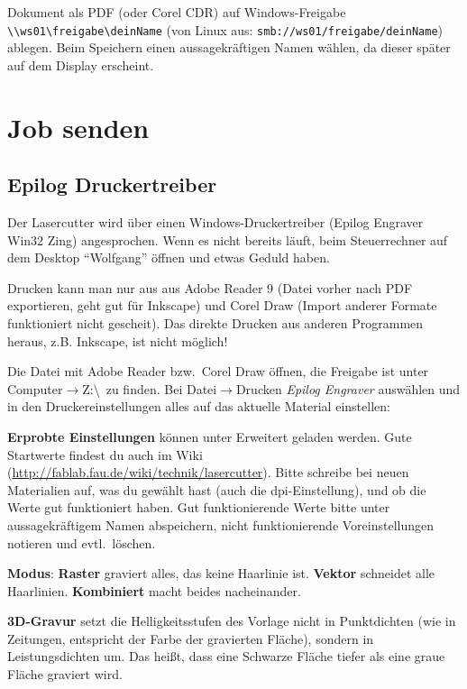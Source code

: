 \documentclass{\basedir/fablab-document}
\begin{document}
Dokument als PDF (oder Corel CDR) auf Windows-Freigabe \texttt{\textbackslash\textbackslash ws01\textbackslash freigabe\textbackslash deinName} (von Linux aus: \texttt{smb://ws01/freigabe/deinName}) ablegen. Beim Speichern einen aussagekräftigen Namen wählen, da dieser später auf dem Display erscheint.

\section{Job senden}
\subsection{Epilog Druckertreiber}

Der Lasercutter wird über einen Windows-Druckertreiber (Epilog Engraver Win32 Zing) angesprochen. Wenn es nicht bereits läuft, beim Steuerrechner auf dem Desktop \enquote{Wolfgang} %
 öffnen und etwas Geduld haben.

Drucken kann man nur aus aus Adobe Reader 9 (Datei vorher nach PDF exportieren, geht gut für Inkscape) und Corel Draw (Import anderer Formate funktioniert nicht gescheit).  Das direkte Drucken aus anderen Programmen heraus, z.B. Inkscape, ist nicht möglich!

Die Datei mit Adobe Reader bzw.\  Corel Draw öffnen, die Freigabe ist unter Computer$\rightarrow$Z:\textbackslash \ zu finden. Bei Datei$\rightarrow$Drucken \textit{Epilog Engraver} auswählen und in den Druckereinstellungen alles auf das aktuelle Material einstellen:

\textbf{Erprobte Einstellungen} können unter Erweitert geladen werden. Gute Startwerte findest du auch im Wiki (\url{http://fablab.fau.de/wiki/technik/lasercutter}). Bitte schreibe bei neuen Materialien auf, was du gewählt hast (auch die dpi-Einstellung), und ob die Werte gut funktioniert haben. Gut funktionierende Werte bitte unter aussagekräftigem Namen abspeichern, nicht funktionierende Voreinstellungen notieren und evtl.\  löschen.

\textbf{Modus}: \textbf{Raster} graviert alles, das keine Haarlinie ist. \textbf{Vektor} schneidet alle Haarlinien. \textbf{Kombiniert} macht beides nacheinander.

\textbf{3D-Gravur} setzt die Helligkeitsstufen des Vorlage nicht in Punktdichten (wie in Zeitungen, entspricht der Farbe der gravierten Fläche), sondern in Leistungsdichten um. Das heißt, dass eine Schwarze Fläche tiefer als eine graue Fläche graviert wird.
\end{document}
